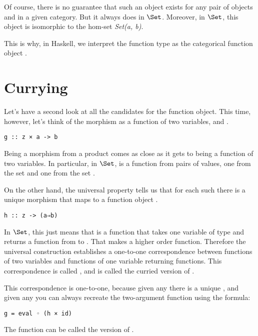 \noindent
Of course, there is no guarantee that such an object  exists
for any pair of objects  and  in a given category.
But it always does in $\Set$. Moreover, in $\Set$, this
object is isomorphic to the hom-set \emph{Set(a, b)}.

This is why, in Haskell, we interpret the function type
 as the categorical function object
.

\section{Currying}\label{currying}

Let's have a second look at all the candidates for the function object.
This time, however, let's think of the morphism  as a function
of two variables,  and .

\begin{Verbatim}[commandchars=\\\{\}]
g :: z × a -> b
\end{Verbatim}
Being a morphism from a product comes as close as it gets to being a
function of two variables. In particular, in $\Set$,  is
a function from pairs of values, one from the set  and one
from the set .

On the other hand, the universal property tells us that for each such
 there is a unique morphism  that maps  to
a function object .

\begin{Verbatim}[commandchars=\\\{\}]
h :: z -> (a⇒b)
\end{Verbatim}
In $\Set$, this just means that  is a function that
takes one variable of type  and returns a function from
 to . That makes  a higher order function.
Therefore the universal construction establishes a one-to-one
correspondence between functions of two variables and functions of one
variable returning functions. This correspondence is called
, and  is called the curried version of
.

This correspondence is one-to-one, because given any  there is
a unique , and given any  you can always recreate
the two-argument function  using the formula:

\begin{Verbatim}[commandchars=\\\{\}]
g = eval ◦ (h × id)
\end{Verbatim}
The function  can be called the  version of
.

